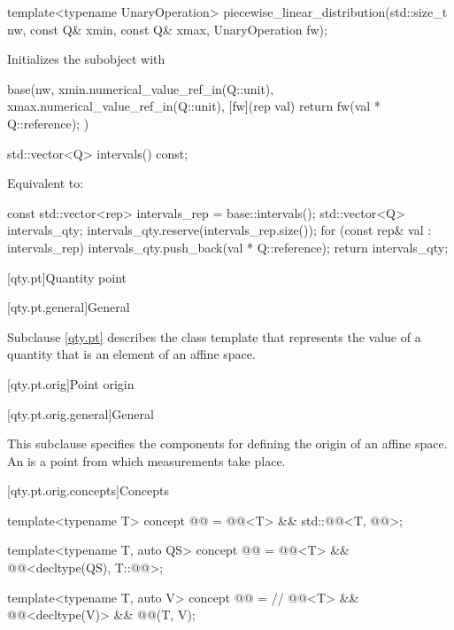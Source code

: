\begin{itemdecl}
template<typename UnaryOperation>
piecewise_linear_distribution(std::size_t nw, const Q& xmin, const Q& xmax, UnaryOperation fw);
\end{itemdecl}

\begin{itemdescr}
\pnum
\effects
Initializes the  subobject with
\begin{codeblock}
base(nw, xmin.numerical_value_ref_in(Q::unit), xmax.numerical_value_ref_in(Q::unit),
     [fw](rep val) { return fw(val * Q::reference); })
\end{codeblock}
\end{itemdescr}

\begin{itemdecl}
std::vector<Q> intervals() const;
\end{itemdecl}

\begin{itemdescr}
\pnum
\effects
Equivalent to:
\begin{codeblock}
const std::vector<rep> intervals_rep = base::intervals();
std::vector<Q> intervals_qty;
intervals_qty.reserve(intervals_rep.size());
for (const rep& val : intervals_rep) {
  intervals_qty.push_back(val * Q::reference);
}
return intervals_qty;
\end{codeblock}
\end{itemdescr}

[qty.pt]{Quantity point}

[qty.pt.general]{General}

\pnum
Subclause \ref{qty.pt} describes the class template 
that represents the value of a quantity
that is an element of an affine space.

[qty.pt.orig]{Point origin}

[qty.pt.orig.general]{General}

\pnum
This subclause specifies the components
for defining the origin of an affine space.
An  is a point from which measurements take place.

[qty.pt.orig.concepts]{Concepts}

\begin{itemdecl}
template<typename T>
concept @@ = @@<T> && std::@@<T, @@>;

template<typename T, auto QS>
concept @@ = @@<T> && @@<decltype(QS), T::@@>;

template<typename T, auto V>
concept @@ =  // \expos
  @@<T> && @@<decltype(V)> && @@(T{}, V);
\end{itemdecl}


